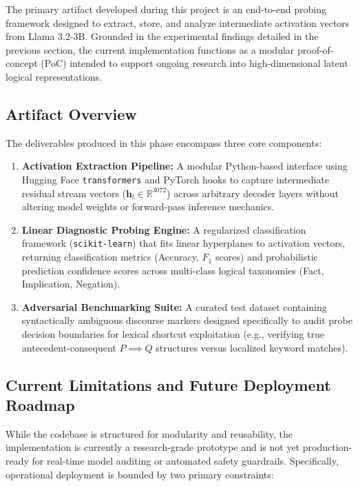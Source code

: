 \documentclass[12 pt]{article}  %
\begin{document}
The primary artifact developed during this project is an end-to-end probing 
framework designed to extract, store, and analyze intermediate activation 
vectors from Llama 3.2-3B. Grounded in the experimental findings detailed in 
the previous section, the current implementation functions as a modular 
proof-of-concept (PoC) intended to support ongoing research into high-dimensional 
latent logical representations.

\subsection{Artifact Overview}

The deliverables produced in this phase encompass three core components:

\begin{enumerate}
    \item \textbf{Activation Extraction Pipeline:} A modular Python-based 
    interface using Hugging Face \texttt{transformers} and PyTorch hooks to 
    capture intermediate residual stream vectors ($\mathbf{h}_l \in \mathbb{R}^{3072}$) 
    across arbitrary decoder layers without altering model weights or forward-pass 
    inference mechanics.
    \item \textbf{Linear Diagnostic Probing Engine:} A regularized classification 
    framework (\texttt{scikit-learn}) that fits linear hyperplanes to activation 
    vectors, returning classification metrics (Accuracy, $F_1$ scores) and 
    probabilistic prediction confidence scores across multi-class logical 
    taxonomies (Fact, Implication, Negation).
    \item \textbf{Adversarial Benchmarking Suite:} A curated test dataset 
    containing syntactically ambiguous discourse markers designed specifically 
    to audit probe decision boundaries for lexical shortcut exploitation 
    (e.g., verifying true antecedent-consequent $P \implies Q$ structures versus 
    localized keyword matches).
\end{enumerate}

\subsection{Current Limitations and Future Deployment Roadmap}

While the codebase is structured for modularity and reusability, the 
implementation is currently a research-grade prototype and is not yet 
production-ready for real-time model auditing or automated safety guardrails. 
Specifically, operational deployment is bounded by two primary constraints:
\end{document}
